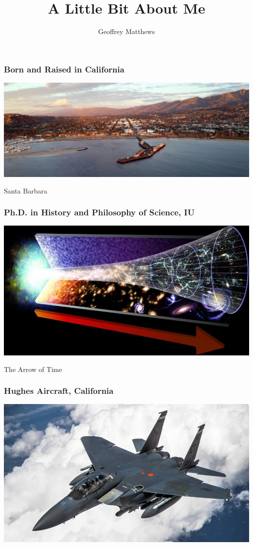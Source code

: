 \documentclass{beamer}
\title{A Little Bit About Me}
\author{Geoffrey Matthews}
\begin{document}
\frame{\titlepage}

\begin{frame}
\frametitle{Born and Raised in California}
\includegraphics[width=\textwidth]{santabarbara}
\centerline{Santa Barbara}
\end{frame}
\begin{frame}
\frametitle{Ph.D. in History and Philosophy of Science, IU}
\includegraphics[width=\textwidth]{arrowoftime}
\centerline{The Arrow of Time}
\end{frame}

\begin{frame}
\frametitle{Hughes Aircraft, California}
\includegraphics[width=\textwidth]{f15}
\end{frame}
\end{document}
